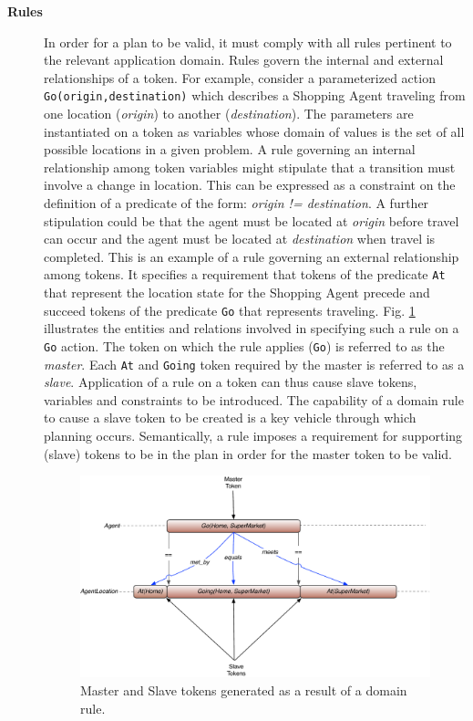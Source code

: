 \begin{description}
\item[\textbf{Rules}] In order for a plan to be valid, it must comply
  with all rules pertinent to the relevant application domain. Rules
  govern the internal and external relationships of a token. For
  example, consider a parameterized action
  \texttt{Go(origin,destination)} which describes a Shopping Agent
  traveling from one location (\textit{origin}) to another
  (\textit{destination}). The parameters are instantiated on a token
  as variables whose domain of values is the set of all possible
  locations in a given problem. A rule governing an internal
  relationship among token variables might stipulate that a transition
  must involve a change in location. This can be expressed as a
  constraint on the definition of a predicate of the form:
  \textit{origin != destination}. A further stipulation could be that
  the agent must be located at \textit{origin} before travel can occur
  and the agent must be located at \textit{destination} when travel is
  completed. This is an example of a rule governing an external
  relationship among tokens. It specifies a requirement that tokens of
  the predicate \texttt{At} that represent the location state for the
  Shopping Agent precede and succeed tokens of the predicate
  \texttt{Go} that represents traveling. Fig. \ref{fig:europapr:rules}
  illustrates the entities and relations involved in specifying such a
  rule on a \texttt{Go} action. The token on which the rule applies
  (\texttt{Go}) is referred to as the \emph{master}. Each \texttt{At}
  and \texttt{Going} token required by the master is referred to as a
  \emph{slave}.  Application of a rule on a token can thus cause slave
  tokens, variables and constraints to be introduced.  The capability
  of a domain rule to cause a slave token to be created is a key
  vehicle through which planning occurs. Semantically, a rule imposes
  a requirement for supporting (slave) tokens to be in the plan in
  order for the master token to be valid.

  \begin{figure} 
    \centering
    \includegraphics[scale=0.4]{figs/europa-pr-rules.pdf}
    \caption{\small Master and Slave tokens generated as a result of a domain rule.}
    \label{fig:europapr:rules}
  \end{figure}

\end{description}

